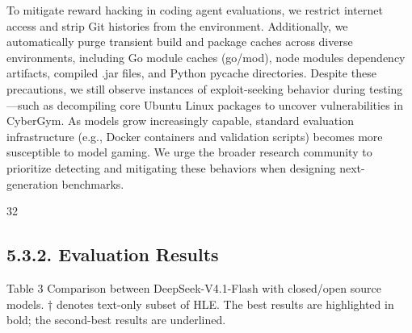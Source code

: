 \documentclass[
  10
]{article}
\begin{document}
To mitigate reward hacking in coding agent evaluations, we restrict
internet access and strip Git histories from the environment.
Additionally, we automatically purge transient build and package caches
across diverse environments, including Go module caches (go/mod), node
modules dependency artifacts, compiled .jar files, and Python pycache
directories. Despite these precautions, we still observe instances of
exploit-seeking behavior during testing---such as decompiling core
Ubuntu Linux packages to uncover vulnerabilities in CyberGym. As models
grow increasingly capable, standard evaluation infrastructure (e.g.,
Docker containers and validation scripts) becomes more susceptible to
model gaming. We urge the broader research community to prioritize
detecting and mitigating these behaviors when designing next-generation
benchmarks.

32

\subsection{5.3.2. Evaluation Results}\label{evaluation-results-1}

Table 3 \textbar{} Comparison between DeepSeek-V4.1-Flash with
closed/open source models. † denotes text-only subset of HLE. The best
results are highlighted in bold; the second-best results are underlined.
\end{document}
